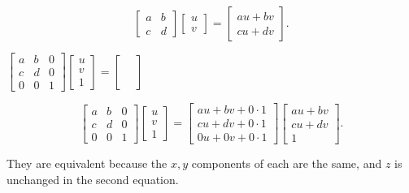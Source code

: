 \documentclass[../key.tex]{subfiles}
\begin{document}
$$\begin{bmatrix} a & b \\ c & d \end{bmatrix} \begin{bmatrix} u \\ v \end{bmatrix} = \begin{bmatrix} au+bv \\ cu+dv \end{bmatrix}.$$

\begin{inner_problem}
\item $\left[\begin{array}{ccc}a & b & 0 \\ c & d & 0 \\ 0 & 0 & 1 \end{array}\right]\left[\begin{array}{c}u \\ v \\ 1 \end{array}\right] = \left[\begin{array}{c}\phantom{u} \\ \phantom{v} \\ \phantom{1} \end{array}\right]$
\end{inner_problem}

$$\begin{bmatrix} a & b & 0 \\ c & d & 0 \\ 0 & 0 & 1 \end{bmatrix} \begin{bmatrix} u \\ v \\ 1 \end{bmatrix} = \begin{bmatrix} au + bv + 0\cdot 1 \\ cu + dv + 0\cdot 1 \\ 0u + 0v + 0\cdot 1 \end{bmatrix} \begin{bmatrix} au+bv \\ cu+dv \\ 1 \end{bmatrix}.$$

They are equivalent because the $x,y$ components of each are the same, and $z$ is unchanged in the second equation.

\begin{outer_problem}
\item
\end{outer_problem}
\end{document}
